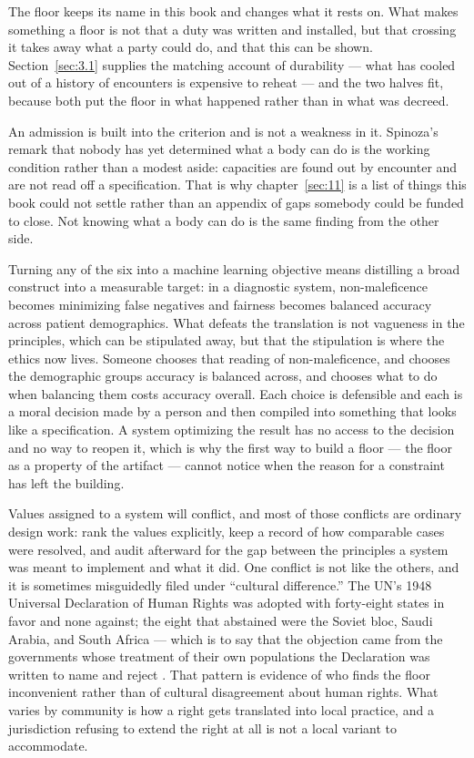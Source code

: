 The floor keeps its name in this book and changes what it rests on. What makes something a floor is not that a duty was written and installed, but that crossing it takes away what a party could do, and that this can be shown. Section~\ref{sec:3.1} supplies the matching account of durability — what has cooled out of a history of encounters is expensive to reheat — and the two halves fit, because both put the floor in what happened rather than in what was decreed.

An admission is built into the criterion and is not a weakness in it. Spinoza's remark that nobody has yet determined what a body can do \autocite[III P2 Schol.]{spinoza1985collected} is the working condition rather than a modest aside: capacities are found out by encounter and are not read off a specification. That is why chapter~\ref{sec:11} is a list of things this book could not settle rather than an appendix of gaps somebody could be funded to close. Not knowing what a body can do is the same finding from the other side.

Turning any of the six into a machine learning objective means distilling a broad construct into a measurable target: in a diagnostic system, non-maleficence becomes minimizing false negatives and fairness becomes balanced accuracy across patient demographics. What defeats the translation is not vagueness in the principles, which can be stipulated away, but that the stipulation is where the ethics now lives. Someone chooses that reading of non-maleficence, and chooses the demographic groups accuracy is balanced across, and chooses what to do when balancing them costs accuracy overall. Each choice is defensible and each is a moral decision made by a person and then compiled into something that looks like a specification. A system optimizing the result has no access to the decision and no way to reopen it, which is why the first way to build a floor — the floor as a property of the artifact — cannot notice when the reason for a constraint has left the building.

Values assigned to a system will conflict, and most of those conflicts are ordinary design work: rank the values explicitly, keep a record of how comparable cases were resolved, and audit afterward for the gap between the principles a system was meant to implement and what it did. One conflict is not like the others, and it is sometimes misguidedly filed under “cultural difference.” The UN's 1948 Universal Declaration of Human Rights was adopted with forty-eight states in favor and none against; the eight that abstained were the Soviet bloc, Saudi Arabia, and South Africa — which is to say that the objection came from the governments whose treatment of their own populations the Declaration was written to name and reject \autocite{un1948udhr}. That pattern is evidence of who finds the floor inconvenient rather than of cultural disagreement about human rights. What varies by community is how a right gets translated into local practice, and a jurisdiction refusing to extend the right at all is not a local variant to accommodate.

